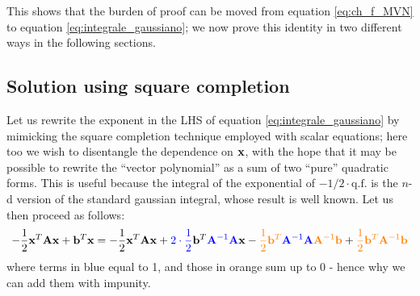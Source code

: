 \documentclass[a4paper]{article}
\newcommand{\mat}[1]{\vb{#1}}
\begin{document}
This shows that the burden of proof can be moved from equation \eqref{eq:ch_f_MVN} to equation \eqref{eq:integrale_gaussiano}; we now prove this identity in two different ways in the following sections.

\subsection{Solution using square completion}\label{subsec:square_completion}
Let us rewrite the exponent in the LHS of equation \eqref{eq:integrale_gaussiano} by mimicking the square completion technique employed with scalar equations; here too we wish to disentangle the dependence on $\vb{x}$, with the hope that it may be possible to rewrite the ``vector polynomial'' as a sum of two ``pure'' quadratic forms. This is useful because the integral of the exponential of $-1/2 \cdot \text{q.f.}$ is the $n$-d version of the standard gaussian integral, whose result is well known. Let us then proceed as follows:
\begin{equation*}
    -\frac{1}{2}\vb{x}^T\mat{A}\vb{x} +\vb{b}^T \vb{x} = -\frac{1}{2}\vb{x}^T\mat{A}\vb{x} + \textcolor{blue}{2\cdot\frac{1}{2}}\vb{b}^T \textcolor{blue}{\mat{A}^{-1}\mat{A}}\vb{x} - \textcolor{orange}{\frac{1}{2}\vb{b}^T \textcolor{blue}{\mat{A}^{-1}\mat{A}} \mat{A}^{-1}\vb{b}} + \textcolor{orange}{\frac{1}{2}\vb{b}^T \mat{A}^{-1}\vb{b}}
\end{equation*}
where terms in blue equal to 1, and those in orange sum up to 0 - hence why we can add them with impunity.
\end{document}
